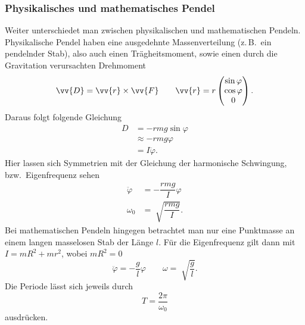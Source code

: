\documentclass[a4paper,12pt]{article}
\begin{document}
\subsubsection{Physikalisches und mathematisches Pendel}
Weiter unterschiedet man zwischen physikalischen und mathematischen Pendeln. Physikalische Pendel haben eine ausgedehnte Massenverteilung (z.\,B.\ ein pendelnder Stab), also auch einen Trägheitsmoment, sowie einen durch die Gravitation verursachten Drehmoment
\[ 
        \vv{D}=\vv{r}\times \vv{F}\qquad \vv{r}=r\left(\begin{matrix}
                \sin \varphi \\\cos \varphi \\0
        \end{matrix}\right)
.\] 
Daraus folgt folgende Gleichung
\begin{align*}
        D&=-rmg\sin \varphi \\
         &\approx -rmg\varphi \\
         &=I\ddot{\varphi }
.\end{align*}
Hier lassen sich Symmetrien mit der Gleichung der harmonische Schwingung, bzw.\ Eigenfrequenz sehen
\begin{align*}
        \ddot{\varphi }&=-\dfrac{rmg}{I}\varphi\\
        \omega _0&=\sqrt[]{\dfrac{rmg}{I}}
.\end{align*}
Bei mathematischen Pendeln hingegen betrachtet man nur eine Punktmasse an einem langen masselosen Stab der Länge $l$. Für die Eigenfrequenz gilt dann mit $I=mR^2+mr^2$, wobei $mR^2=0$ 
\[ 
        \ddot{\varphi }=-\dfrac{g}{l}\varphi \qquad \omega =\sqrt[]{\dfrac{g}{l}}
.\] 
Die Periode lässt sich jeweils durch
\[ 
        T=\dfrac{2\pi }{\omega _0}
\] 
ausdrücken.
\end{document}
